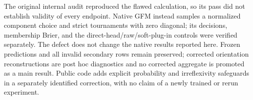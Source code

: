 The original internal audit reproduced the flawed calculation, so its pass did not establish validity of every endpoint. Native GFM instead samples a normalized component choice and strict tournaments with zero diagonal; its decisions, membership Brier, and the direct-head/raw/soft-plug-in controls were verified separately. The defect does not change the native results reported here. Frozen predictions and all invalid secondary rows remain preserved; corrected orientation reconstructions are post hoc diagnostics and no corrected aggregate is promoted as a main result. Public code adds explicit probability and irreflexivity safeguards in a separately identified correction, with no claim of a newly trained or rerun experiment.
